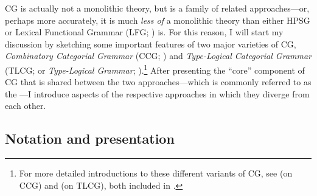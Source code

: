 \documentclass[output=paper
                ,modfonts
 	        ,biblatex
                ,babelshorthands
                ,newtxmath
                ,draftmode
                ,colorlinks, citecolor=brown
]{langscibook}
\begin{document}
CG is actually not a monolithic theory, but is a family of related
approaches---or, perhaps more accurately, it is much \emph{less of} a
monolithic theory than either HPSG or Lexical Functional Grammar (LFG;
\citealt{KB82a-u,BATW2015a}) is. For this reason, I will
start my discussion by sketching some important features of two major
varieties of CG, \emph{Combinatory Categorial Grammar} (CCG;
\citealt{Steedman2000a-u,steedman2012}) and \emph{Type-Logical Categorial Grammar} (TLCG; or \emph{Type-Logical Grammar};
\citealt{Morrill94a-u,Moortgat2011a-u,KubotaLevineBook}).\footnote{For 
more detailed introductions to these different variants of CG, see 
\citet{steedman2011ccg} (on CCG) and \citet{oehrle2011} (on 
TLCG), both included in \citet{BB2011a}.} After presenting the ``core''
component of CG that is shared between the two approaches---which is
commonly referred to as the ---I introduce
aspects of the respective approaches in which they diverge from each
other.


\subsection{Notation and presentation }
\end{document}
